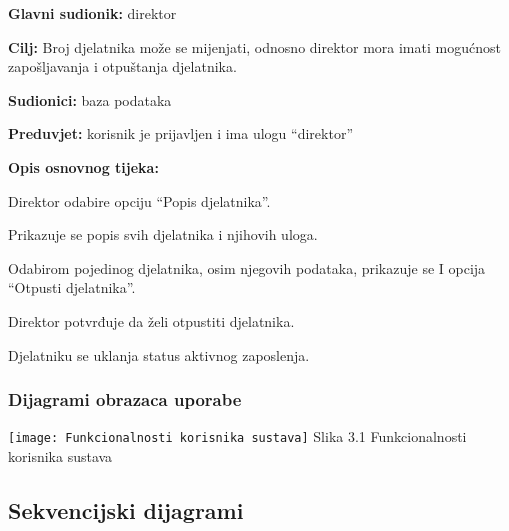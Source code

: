 			\begin{packed_item}
				\item \textbf{Glavni sudionik: } direktor
				\item  \textbf{Cilj:} Broj djelatnika može se mijenjati, odnosno direktor mora imati mogućnost zapošljavanja i otpuštanja djelatnika. 
				\item  \textbf{Sudionici:} baza podataka
				\item  \textbf{Preduvjet:} korisnik je prijavljen i ima ulogu “direktor”
				\item  \textbf{Opis osnovnog tijeka:}
				\item[] \begin{packed_enum}
					\item Direktor odabire opciju “Popis djelatnika”. 
					\item Prikazuje se popis svih djelatnika i njihovih uloga. 
					\item Odabirom pojedinog djelatnika, osim njegovih podataka, prikazuje se I opcija “Otpusti djelatnika”. 
					\item Direktor potvrđuje da želi otpustiti djelatnika. 
					\item Djelatniku se uklanja status aktivnog zaposlenja. 
				\end{packed_enum}
			\end{packed_item}
			\eject
				\subsubsection{Dijagrami obrazaca uporabe\\}
					
				\texttt{[image: Funkcionalnosti korisnika sustava]}
				Slika 3.1 Funkcionalnosti korisnika sustava
				\eject		
				
			\subsection{Sekvencijski dijagrami}
				
